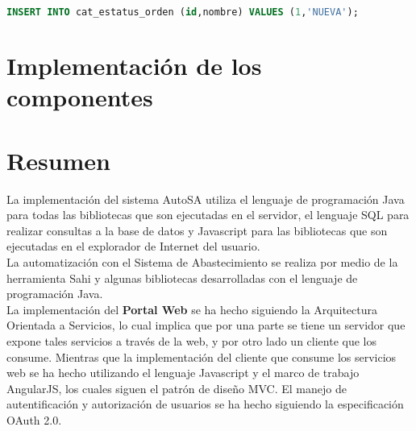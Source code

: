 \begin{lstlisting}[language=SQL, caption={Sentencia insertar un registro.}, captionpos=b, label={lst:sql-insert}]
INSERT INTO cat_estatus_orden (id,nombre) VALUES (1,'NUEVA');
\end{lstlisting}

%

\section{Implementación de los componentes}







%



%

\section{Resumen}
La implementación del sistema AutoSA utiliza el lenguaje de programación Java para todas las bibliotecas que son ejecutadas en el servidor, el lenguaje SQL para realizar consultas a la base de datos y Javascript para las bibliotecas que son ejecutadas en el explorador de Internet del usuario.\\
La automatización con el Sistema de Abastecimiento se realiza por medio de la herramienta Sahi y algunas bibliotecas desarrolladas con el lenguaje de programación Java.\\
La implementación del \textbf{Portal Web} se ha hecho siguiendo la Arquitectura Orientada a Servicios, lo cual implica que por una parte se tiene un servidor que expone tales servicios a través de la web, y por otro lado un cliente que los consume. Mientras que la implementación del cliente que consume los servicios web se ha hecho utilizando el lenguaje Javascript y el marco de trabajo AngularJS, los cuales siguen el patrón de diseño MVC. El manejo de autentificación y autorización de usuarios se ha hecho siguiendo la especificación OAuth 2.0.
